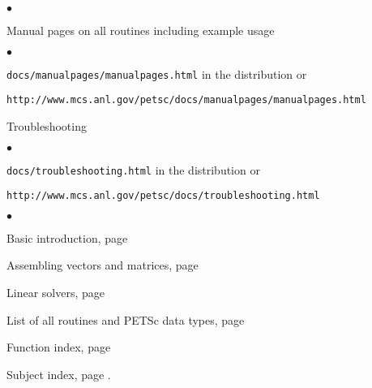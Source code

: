 \begin{list}{$\bullet$}
{
\setlength{\itemsep}{-.020in} 
\setlength{\topsep}{0in} 
\setlength{\partopsep}{0in}
}
\item Manual pages on all routines including example usage
\begin{list}{$\bullet$}
{
\setlength{\itemsep}{-.020in} 
\setlength{\topsep}{0in} 
\setlength{\partopsep}{0in}
}
   \item {\tt docs/manualpages/manualpages.html} in the distribution or 
   \item {\tt http://www.mcs.anl.gov/petsc/docs/manualpages/manualpages.html}
\end{list}
\item Troubleshooting
\begin{list}{$\bullet$}
{
\setlength{\itemsep}{-.020in} 
\setlength{\topsep}{0in} 
\setlength{\partopsep}{0in}
}
   \item {\tt docs/troubleshooting.html} in the distribution or
   \item {\tt http://www.mcs.anl.gov/petsc/docs/troubleshooting.html}
\end{list}
\end{list}

\begin{list}{$\bullet$}
{
\setlength{\itemsep}{-.02in} 
\setlength{\topsep}{0in} 
\setlength{\partopsep}{0in}
}
\item Basic introduction, page \pageref{sec:veccreate}
\item Assembling vectors and matrices, page \pageref{chapter:matrices}
\item Linear solvers, page \pageref{ch:sles}
\item List of all routines and PETSc data types, page \pageref{routines}
\item Function index, page \pageref{findex}
\item Subject index, page \pageref{sindex}.
\end{list}

